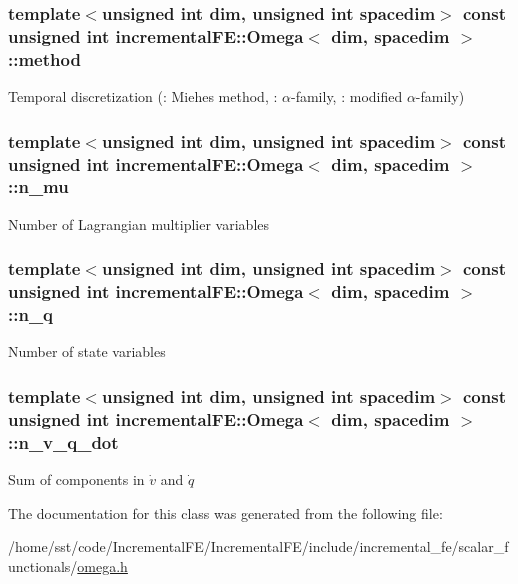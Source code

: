 \subsubsection[{\texorpdfstring{method}{method}}]{\setlength{\rightskip}{0pt plus 5cm}template$<$unsigned int dim, unsigned int spacedim$>$ const unsigned int {\bf incremental\+F\+E\+::\+Omega}$<$ dim, spacedim $>$\+::method\hspace{0.3cm}{\ttfamily [private]}}\hypertarget{classincremental_f_e_1_1_omega_a7600d263ebf98129629e44fa67e8a58c}{}\label{classincremental_f_e_1_1_omega_a7600d263ebf98129629e44fa67e8a58c}
Temporal discretization ({}\+: Miehe\textquotesingle{}s method, {}\+: $\alpha$-\/family, {}\+: modified $\alpha$-\/family) 
\subsubsection[{\texorpdfstring{n\+\_\+mu}{n_mu}}]{\setlength{\rightskip}{0pt plus 5cm}template$<$unsigned int dim, unsigned int spacedim$>$ const unsigned int {\bf incremental\+F\+E\+::\+Omega}$<$ dim, spacedim $>$\+::n\+\_\+mu}\hypertarget{classincremental_f_e_1_1_omega_a322340b50451ab46f91cdcec95248f16}{}\label{classincremental_f_e_1_1_omega_a322340b50451ab46f91cdcec95248f16}
Number of Lagrangian multiplier variables 
\subsubsection[{\texorpdfstring{n\+\_\+q}{n_q}}]{\setlength{\rightskip}{0pt plus 5cm}template$<$unsigned int dim, unsigned int spacedim$>$ const unsigned int {\bf incremental\+F\+E\+::\+Omega}$<$ dim, spacedim $>$\+::n\+\_\+q}\hypertarget{classincremental_f_e_1_1_omega_addbf75c949792f6340ea40164a2bfee3}{}\label{classincremental_f_e_1_1_omega_addbf75c949792f6340ea40164a2bfee3}
Number of state variables 
\subsubsection[{\texorpdfstring{n\+\_\+v\+\_\+q\+\_\+dot}{n_v_q_dot}}]{\setlength{\rightskip}{0pt plus 5cm}template$<$unsigned int dim, unsigned int spacedim$>$ const unsigned int {\bf incremental\+F\+E\+::\+Omega}$<$ dim, spacedim $>$\+::n\+\_\+v\+\_\+q\+\_\+dot}\hypertarget{classincremental_f_e_1_1_omega_a7fa938b26804b0dc15726f3423332880}{}\label{classincremental_f_e_1_1_omega_a7fa938b26804b0dc15726f3423332880}
Sum of components in $\dot{v}$ and $\dot{q}$ 

The documentation for this class was generated from the following file\+:\begin{DoxyCompactItemize}
\item 
/home/sst/code/\+Incremental\+F\+E/\+Incremental\+F\+E/include/incremental\+\_\+fe/scalar\+\_\+functionals/\hyperlink{omega_8h}{omega.\+h}\end{DoxyCompactItemize}
